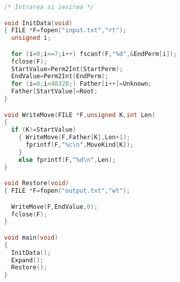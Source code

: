 \begin{lstlisting}[language=C]
/* Intrarea si iesirea */

void InitData(void)
{ FILE *F=fopen("input.txt","rt");
  unsigned i;

  for (i=0;i<=7;i++) fscanf(F,"%d",&EndPerm[i]);
  fclose(F);
  StartValue=Perm2Int(StartPerm);
  EndValue=Perm2Int(EndPerm);
  for (i=0;i<40320;) Father[i++]=Unknown;
  Father[StartValue]=Root;
}

void WriteMove(FILE *F,unsigned K,int Len)
{
  if (K!=StartValue)
    { WriteMove(F,Father[K],Len+1);
      fprintf(F,"%c\n",MoveKind[K]);
    }
    else fprintf(F,"%d\n",Len);
}

void Restore(void)
{ FILE *F=fopen("output.txt","wt");

  WriteMove(F,EndValue,0);
  fclose(F);
}

void main(void)
{
  InitData();
  Expand();
  Restore();
}
\end{lstlisting}
